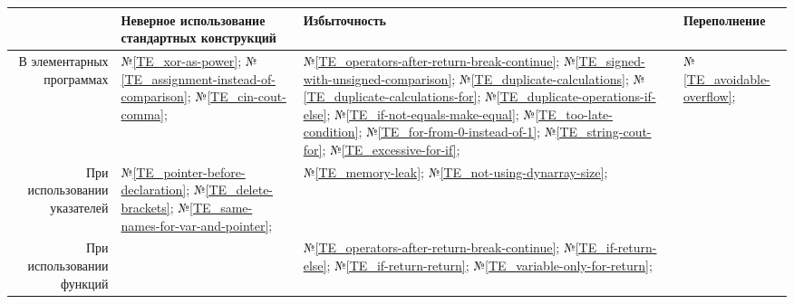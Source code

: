 \begin{center}
	\begin{tabular}{|r|m{4.5cm}|m{4cm}|m{4cm}|}\hline
		 & Неверное использование стандартных конструкций & Избыточность & Переполнение
		\\\hline
			В элементарных программах
		& 
			№\ref{TE_xor-as-power};
			№\ref{TE_assignment-instead-of-comparison};
			№\ref{TE_cin-cout-comma};
		&
			№\ref{TE_operators-after-return-break-continue}; %
			№\ref{TE_signed-with-unsigned-comparison};
			№\ref{TE_duplicate-calculations};
			№\ref{TE_duplicate-calculations-for};
			№\ref{TE_duplicate-operations-if-else};
			№\ref{TE_if-not-equals-make-equal};
			№\ref{TE_too-late-condition};
			№\ref{TE_for-from-0-instead-of-1};
			№\ref{TE_string-cout-for};
			№\ref{TE_excessive-for-if};
		&
			№\ref{TE_avoidable-overflow};
		\\\hline
			При использовании указателей
		&
			№\ref{TE_pointer-before-declaration};
			№\ref{TE_delete-brackets};
			№\ref{TE_same-names-for-var-and-pointer};
		&
			№\ref{TE_memory-leak};
			№\ref{TE_not-using-dynarray-size};
		&
		\\\hline
		При использовании функций
		&
		&
			№\ref{TE_operators-after-return-break-continue}; %
			№\ref{TE_if-return-else};
			№\ref{TE_if-return-return};
			№\ref{TE_variable-only-for-return};
		&
		\\\hline
	\end{tabular}
\end{center}
